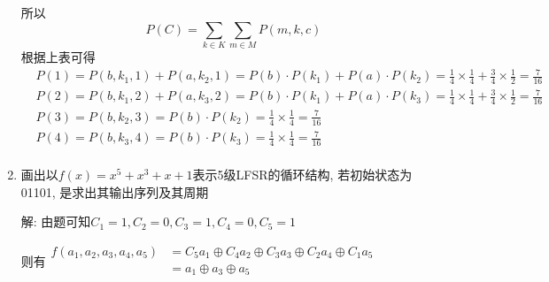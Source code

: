 \documentclass[UTF8]{ctexart}
\begin{document}
\begin{enumerate}
      所以
      $$P(C)=\sum\limits_{k\in K}\sum\limits_{m\in M}P(m,k,c)$$
      根据上表可得
      $$
      \begin{aligned}
        &P(1)=P(b,k_1,1)+P(a,k_2,1)=P(b)\cdot P(k_1)+P(a)\cdot P(k_2)=\frac{1}{4}\times \frac{1}{4}+\frac{3}{4}\times \frac{1}{2}=\frac{7}{16}\\
        &P(2)=P(b,k_1,2)+P(a,k_3,2)=P(b)\cdot P(k_1)+P(a)\cdot P(k_3)=\frac{1}{4}\times \frac{1}{4}+\frac{3}{4}\times \frac{1}{2}=\frac{7}{16}\\
        &P(3)=P(b,k_2,3)=P(b)\cdot P(k_2)=\frac{1}{4}\times \frac{1}{4}=\frac{7}{16}\\
        &P(4)=P(b,k_3,4)=P(b)\cdot P(k_3)=\frac{1}{4}\times \frac{1}{4}=\frac{7}{16}\\
      \end{aligned}
      $$
      \item 画出以$f(x)=x^5+x^3+x+1$表示5级LFSR的循环结构, 若初始状态为01101, 是求出其输出序列及其周期

      解: 由题可知$C_1=1, C_2=0, C_3=1, C_4=0, C_5=1$

      则有$
      \begin{aligned}
        f(a_1, a_2, a_3, a_4, a_5)&=C_5a_1\oplus C_4a_2\oplus C_3a_3\oplus C_2a_4\oplus C_1a_5\\
                                  &=a_1\oplus a_3\oplus a_5\\
      \end{aligned}
      $


\end{enumerate}
\end{document}
